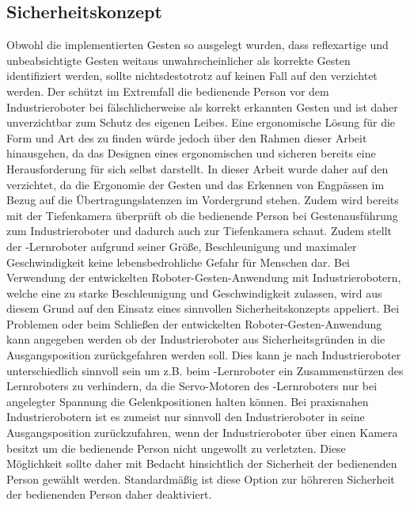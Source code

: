 \subsection{Sicherheitskonzept} %
Obwohl die implementierten Gesten so ausgelegt wurden, dass reflexartige und unbeabsichtigte Gesten weitaus unwahrscheinlicher als korrekte Gesten identifiziert werden, sollte nichtsdestotrotz auf keinen Fall auf den  verzichtet werden. Der  schützt im Extremfall die bedienende Person vor dem Industrieroboter bei fälschlicherweise als korrekt erkannten Gesten und ist daher unverzichtbar zum Schutz des eigenen Leibes. Eine ergonomische Lösung für die Form und Art des  zu finden würde jedoch über den Rahmen dieser Arbeit hinausgehen, da das Designen eines ergonomischen und sicheren  bereits eine Herausforderung für sich selbst darstellt. In dieser Arbeit wurde daher auf den  verzichtet, da die Ergonomie der Gesten und das Erkennen von Engpässen im Bezug auf die Übertragungslatenzen im Vordergrund stehen. Zudem wird bereits mit der Tiefenkamera überprüft ob die bedienende Person bei Gestenausführung zum Industrieroboter und dadurch auch zur Tiefenkamera schaut. Zudem stellt der -Lernroboter aufgrund seiner Größe, Beschleunigung und maximaler Geschwindigkeit keine lebensbedrohliche Gefahr für Menschen dar. Bei Verwendung der entwickelten Roboter-Gesten-Anwendung mit Industrierobotern, welche eine zu starke Beschleunigung und Geschwindigkeit zulassen, wird aus diesem Grund auf den Einsatz eines sinnvollen Sicherheitskonzepts appeliert. Bei Problemen oder beim Schließen der entwickelten Roboter-Gesten-Anwendung kann angegeben werden ob der Industrieroboter aus Sicherheitsgründen in die Ausgangsposition zurückgefahren werden soll. Dies kann je nach Industrieroboter unterschiedlich sinnvoll sein um z.B. beim -Lernroboter ein Zusammenstürzen des Lernroboters zu verhindern, da die Servo-Motoren des -Lernroboters nur bei angelegter Spannung die Gelenkpositionen halten können. Bei praxisnahen Industrierobotern ist es zumeist nur sinnvoll den Industrieroboter in seine Ausgangsposition zurückzufahren, wenn der Industrieroboter über einen Kamera besitzt um die bedienende Person nicht ungewollt zu verletzten. Diese Möglichkeit sollte daher mit Bedacht hinsichtlich der Sicherheit der bedienenden Person gewählt werden. Standardmäßig ist diese Option zur höhreren Sicherheit der bedienenden Person daher deaktiviert.

